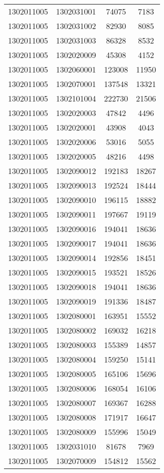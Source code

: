 \begin{longtable}{llcc}
1302011005 & 1302031001 & 74075 & 7183\\
1302011005 & 1302031002 & 82930 & 8085\\
1302011005 & 1302031003 & 86328 & 8532\\
1302011005 & 1302020009 & 45308 & 4152\\
1302011005 & 1302060001 & 123008 & 11950\\
1302011005 & 1302070001 & 137548 & 13321\\
1302011005 & 1302101004 & 222730 & 21506\\
1302011005 & 1302020003 & 47842 & 4496\\
1302011005 & 1302020001 & 43908 & 4043\\
1302011005 & 1302020006 & 53016 & 5055\\
1302011005 & 1302020005 & 48216 & 4498\\
1302011005 & 1302090012 & 192183 & 18267\\
1302011005 & 1302090013 & 192524 & 18444\\
1302011005 & 1302090010 & 196115 & 18882\\
1302011005 & 1302090011 & 197667 & 19119\\
1302011005 & 1302090016 & 194041 & 18636\\
1302011005 & 1302090017 & 194041 & 18636\\
1302011005 & 1302090014 & 192856 & 18451\\
1302011005 & 1302090015 & 193521 & 18526\\
1302011005 & 1302090018 & 194041 & 18636\\
1302011005 & 1302090019 & 191336 & 18487\\
1302011005 & 1302080001 & 163951 & 15552\\
1302011005 & 1302080002 & 169032 & 16218\\
1302011005 & 1302080003 & 155389 & 14857\\
1302011005 & 1302080004 & 159250 & 15141\\
1302011005 & 1302080005 & 165106 & 15696\\
1302011005 & 1302080006 & 168054 & 16106\\
1302011005 & 1302080007 & 169367 & 16288\\
1302011005 & 1302080008 & 171917 & 16647\\
1302011005 & 1302080009 & 155996 & 15049\\
1302011005 & 1302031010 & 81678 & 7969\\
1302011005 & 1302070009 & 154812 & 15562\\

\end{longtable}
